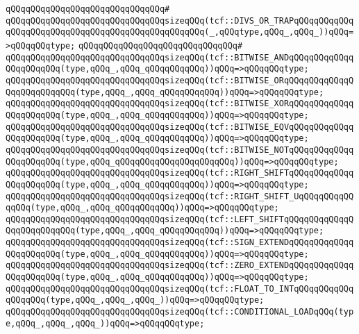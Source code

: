 \verb|qQQqqQQqqQQqqQQqqQQqqQQqqQQqqQQq#|\newline
\verb|qQQqqQQqqQQqqQQqqQQqqQQqqQQqqQQqsizeqQQq(tcf::DIVS_OR_TRAPqQQqqQQqqQQqqQQqqQQqqQQqqQQqqQQqqQQqqQQqqQQqqQQqqQQq(_,qQQqtype,qQQq_,qQQq_))qQQq=>qQQqqQQqtype;|\newline
\verb|qQQqqQQqqQQqqQQqqQQqqQQqqQQqqQQq#|\newline
\verb|qQQqqQQqqQQqqQQqqQQqqQQqqQQqqQQqsizeqQQq(tcf::BITWISE_ANDqQQqqQQqqQQqqQQqqQQqqQQq(type,qQQq_,qQQq_qQQqqQQqqQQq))qQQq=>qQQqqQQqtype;|\newline
\verb|qQQqqQQqqQQqqQQqqQQqqQQqqQQqqQQqsizeqQQq(tcf::BITWISE_ORqQQqqQQqqQQqqQQqqQQqqQQqqQQq(type,qQQq_,qQQq_qQQqqQQqqQQq))qQQq=>qQQqqQQqtype;|\newline
\verb|qQQqqQQqqQQqqQQqqQQqqQQqqQQqqQQqsizeqQQq(tcf::BITWISE_XORqQQqqQQqqQQqqQQqqQQqqQQq(type,qQQq_,qQQq_qQQqqQQqqQQq))qQQq=>qQQqqQQqtype;|\newline
\verb|qQQqqQQqqQQqqQQqqQQqqQQqqQQqqQQqsizeqQQq(tcf::BITWISE_EQVqQQqqQQqqQQqqQQqqQQqqQQq(type,qQQq_,qQQq_qQQqqQQqqQQq))qQQq=>qQQqqQQqtype;|\newline
\verb|qQQqqQQqqQQqqQQqqQQqqQQqqQQqqQQqsizeqQQq(tcf::BITWISE_NOTqQQqqQQqqQQqqQQqqQQqqQQq(type,qQQq_qQQqqQQqqQQqqQQqqQQqqQQq))qQQq=>qQQqqQQqtype;|\newline
\verb|qQQqqQQqqQQqqQQqqQQqqQQqqQQqqQQqsizeqQQq(tcf::RIGHT_SHIFTqQQqqQQqqQQqqQQqqQQqqQQq(type,qQQq_,qQQq_qQQqqQQqqQQq))qQQq=>qQQqqQQqtype;|\newline
\verb|qQQqqQQqqQQqqQQqqQQqqQQqqQQqqQQqsizeqQQq(tcf::RIGHT_SHIFT_UqQQqqQQqqQQqqQQq(type,qQQq_,qQQq_qQQqqQQqqQQq))qQQq=>qQQqqQQqtype;|\newline
\verb|qQQqqQQqqQQqqQQqqQQqqQQqqQQqqQQqsizeqQQq(tcf::LEFT_SHIFTqQQqqQQqqQQqqQQqqQQqqQQqqQQq(type,qQQq_,qQQq_qQQqqQQqqQQq))qQQq=>qQQqqQQqtype;|\newline
\verb|qQQqqQQqqQQqqQQqqQQqqQQqqQQqqQQqsizeqQQq(tcf::SIGN_EXTENDqQQqqQQqqQQqqQQqqQQqqQQq(type,qQQq_,qQQq_qQQqqQQqqQQq))qQQq=>qQQqqQQqtype;|\newline
\verb|qQQqqQQqqQQqqQQqqQQqqQQqqQQqqQQqsizeqQQq(tcf::ZERO_EXTENDqQQqqQQqqQQqqQQqqQQqqQQq(type,qQQq_,qQQq_qQQqqQQqqQQq))qQQq=>qQQqqQQqtype;|\newline
\verb|qQQqqQQqqQQqqQQqqQQqqQQqqQQqqQQqsizeqQQq(tcf::FLOAT_TO_INTqQQqqQQqqQQqqQQqqQQq(type,qQQq_,qQQq_,qQQq_))qQQq=>qQQqqQQqtype;|\newline
\verb|qQQqqQQqqQQqqQQqqQQqqQQqqQQqqQQqsizeqQQq(tcf::CONDITIONAL_LOADqQQq(type,qQQq_,qQQq_,qQQq_))qQQq=>qQQqqQQqtype;|\newline
